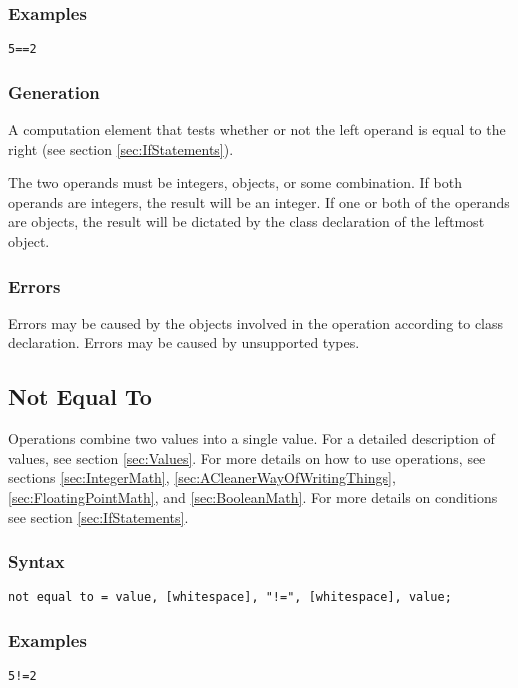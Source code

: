 \documentclass[10pt,a4paper]{article}
\begin{document}
\subsubsection{Examples}
\begin{verbatim}
5==2
\end{verbatim}

\subsubsection{Generation}
A computation element that tests whether or not the left operand is equal to the right (see section \ref{sec:IfStatements}).

The two operands must be integers, objects, or some combination. If both operands are integers, the result will be an integer. If one or both of the operands are objects, the result will be dictated by the class declaration of the leftmost object.

\subsubsection{Errors}
Errors may be caused by the objects involved in the operation according to class declaration. Errors may be caused by unsupported types.

\newpage




\subsection{Not Equal To}
Operations combine two values into a single value. For a detailed description of values, see section \ref{sec:Values}. For more details on how to use operations, see sections \ref{sec:IntegerMath}, \ref{sec:ACleanerWayOfWritingThings}, \ref{sec:FloatingPointMath}, and \ref{sec:BooleanMath}. For more details on conditions see section \ref{sec:IfStatements}.

\subsubsection{Syntax}
\begin{verbatim}
not equal to = value, [whitespace], "!=", [whitespace], value;
\end{verbatim}

\subsubsection{Examples}
\begin{verbatim}
5!=2
\end{verbatim}
\end{document}
